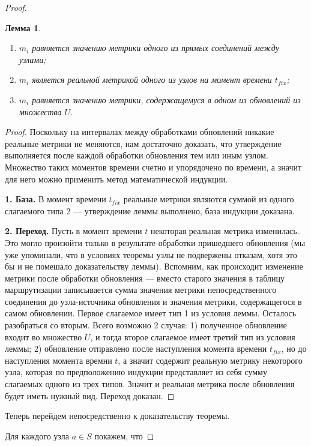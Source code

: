 \documentclass{article}
\theoremstyle{plain}
\theoremstyle{plain}
\theoremstyle{plain}
\newtheorem{lemma}{Лемма}[section]
\theoremstyle{plain}
\theoremstyle{definition}
\theoremstyle{remark}
\theoremstyle{plain}
\begin{document}
\begin{proof}
\begin{lemma}
        \begin{enumerate}
            \item $m_i$ равняется значению метрики одного из прямых соединений между узлами;
            \item $m_i$ является реальной метрикой одного из узлов на момент времени $t_{fix}$;
            \item $m_i$ равняется значению метрики, содержащемуся в одном из обновлений из множества $U$.
        \end{enumerate}
    \end{lemma}
    \begin{proof}
        Поскольку на интервалах между обработками обновлений никакие реальные метрики не меняются, нам достаточно доказать, что утверждение выполняется после каждой обработки обновления тем или иным узлом. Множество таких моментов времени счетно и упорядочено по времени, а значит для него можно применить метод математической индукции.
        
        \textbf{1. База.} В момент времени $t_{fix}$ реальные метрики являются суммой из одного слагаемого типа 2 --- утверждение леммы выполнено, база индукции доказана.
        
        \textbf{2. Переход. } Пусть в момент времени $t$ некоторая реальная метрика изменилась. Это могло произойти только в результате обработки пришедшего обновления (мы уже упоминали, что в условиях теоремы узлы не подвержены отказам, хотя это бы и не помешало доказательству леммы). Вспомним, как происходит изменение метрики после обработки обновления --- вместо старого значения в таблицу маршрутизации записывается сумма значения метрики непосредственного соединения до узла-источника обновления и значения метрики, содержащегося в самом обновлении. Первое слагаемое имеет тип 1 из условия леммы. Осталось разобраться со вторым. Всего возможно 2 случая: 1) полученное обновление входит во множество $U$, и тогда второе слагаемое имеет третий тип из условия леммы; 2) обновление отправлено после наступления момента времени $t_{fix}$, но до наступления момента времни $t$, а значит содержит реальную метрику некоторого узла, которая по предположению индукции представляет из себя сумму слагаемых одного из трех типов. Значит и реальная метрика после обновления будет иметь нужный вид. Переход доказан.
    \end{proof}
    
    Теперь перейдем непосредственно к доказательству теоремы.
    
    Для каждого узла $a \in S$ покажем, что
    

\end{proof}
\end{document}
